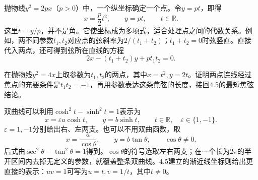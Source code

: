 抛物线\(y^2=2px\)（\(p>0\)）中，一个纵坐标确定一个点。令\(y=pt\)，即得
\begin{equation}\label{eq:quadratic-parabola-parametric}
    x=\frac p2t^2,\qquad y=pt,\qquad t\in\mathbb R .
\end{equation}
这里\(t=y/p\)，并不是角。它使坐标成为多项式，适合处理点之间的代数关系。例如，两不同参数\(t_1,t_2\)对应点的弦斜率为\(2/(t_1+t_2)\)；\(t_1+t_2=0\)时弦竖直。直接代入两点，还可得到弦所在直线的方程
\begin{equation}\label{eq:quadratic-parabola-parameter-chord}
    2x-(t_1+t_2)y+pt_1t_2=0 .
\end{equation}

\par\noindent\begin{minipage}{\linewidth}
\begin{example}
在抛物线\(y^2=4x\)上取参数为\(t_1,t_2\)的两点，其中\(x=t^2,y=2t\)。证明两点连线经过焦点的充要条件是\(t_1t_2=-1\)，再用参数表达这条焦弦的长度，接回4.5的最短焦弦结论。
\end{example}
\end{minipage}\par


双曲线可以利用\(\cosh^2t-\sinh^2t=1\)表示为
\begin{equation}\label{eq:quadratic-hyperbola-hyperbolic-parametric}
    x=\varepsilon a\cosh t,\qquad y=b\sinh t,
    \qquad t\in\mathbb R,\quad\varepsilon\in\{1,-1\} .
\end{equation}
\(\varepsilon=1,-1\)分别给出右、左两支。也可以不用双曲函数，取
\begin{equation}\label{eq:quadratic-hyperbola-sec-parametric}
    x=\frac a{\cos\theta},\qquad y=b\tan\theta,
    \qquad \cos\theta\ne0 .
\end{equation}
后式由\(\sec^2\theta-\tan^2\theta=1\)得到。\(\cos\theta\)的符号选取左右两支；在一个长为\(2\pi\)的半开区间内去掉无定义的参数，就覆盖整条双曲线。4.5建立的渐近线坐标则给出更直接的表示：\(uv=1\)可写为\(u=t,v=1/t\)，其中\(t\ne0\)。

